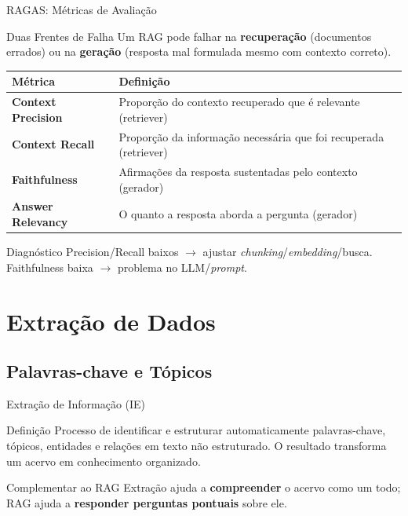 \documentclass[aspectratio=169]{beamer}
\begin{document}
\begin{frame}[shrink=5]{RAGAS: Métricas de Avaliação}
    \begin{alertblock}{Duas Frentes de Falha}
        \footnotesize Um RAG pode falhar na \textbf{recuperação} (documentos errados) ou na \textbf{geração} (resposta mal formulada mesmo com contexto correto).
    \end{alertblock}
    \pause
    \begin{center}\footnotesize
    \begin{tabular}{>{\bfseries}p{2.8cm}p{8.2cm}}
    \toprule
    Métrica & Definição \\
    \midrule
    Context Precision & Proporção do contexto recuperado que é relevante (retriever) \\
    Context Recall & Proporção da informação necessária que foi recuperada (retriever) \\
    Faithfulness & Afirmações da resposta sustentadas pelo contexto (gerador) \\
    Answer Relevancy & O quanto a resposta aborda a pergunta (gerador) \\
    \bottomrule
    \end{tabular}
    \end{center}
    \pause
    \begin{block}{Diagnóstico}
        \footnotesize Precision/Recall baixos $\to$ ajustar \textit{chunking}/\textit{embedding}/busca. Faithfulness baixa $\to$ problema no LLM/\textit{prompt}.
    \end{block}
\end{frame}

\section{Extração de Dados}

\subsection{Palavras-chave e Tópicos}

\begin{frame}{Extração de Informação (IE)}
    \begin{block}{Definição}
        \footnotesize Processo de identificar e estruturar automaticamente palavras-chave, tópicos, entidades e relações em texto não estruturado. O resultado transforma um acervo em conhecimento organizado.
    \end{block}
    \pause
    \begin{alertblock}{Complementar ao RAG}
        \footnotesize Extração ajuda a \textbf{compreender} o acervo como um todo; RAG ajuda a \textbf{responder perguntas pontuais} sobre ele.
    \end{alertblock}
\end{frame}
\end{document}
